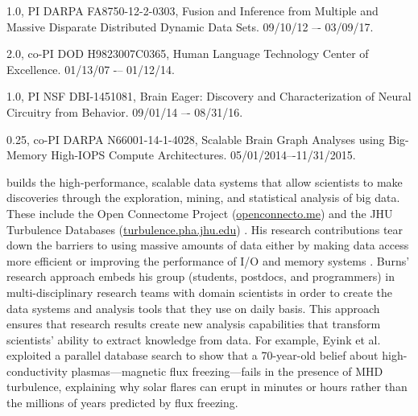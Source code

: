 \begin{list}{[]}{\settowidth{\labelwidth}{0.72 mos., co-PI}\leftmargin{}\advance\leftmargin 0.2in \setlength{\labelsep}{0.2in}}
\addtolength{\itemsep}{-4pt}

\item[1.0, PI]  DARPA FA8750-12-2-0303, Fusion and Inference from Multiple and Massive Disparate Distributed Dynamic Data Sets.  09/10/12 –- 03/09/17.

\item[2.0, co-PI] DOD H9823007C0365, Human Language Technology Center of Excellence. 01/13/07 -– 01/12/14. 

\item[1.0, PI] NSF DBI-1451081, Brain Eager: Discovery and Characterization of Neural Circuitry from Behavior. 09/01/14 –- 08/31/16.

\item[0.25, co-PI] DARPA N66001-14-1-4028, Scalable Brain Graph Analyses using Big-Memory High-IOPS Compute Architectures. 05/01/2014–-11/31/2015.

\end{list}

 builds the high-performance, scalable data systems that allow scientists 
to make discoveries through the exploration, mining, and statistical analysis
of big data.  These include the Open Connectome Project (\url{openconnecto.me})  \cite{Burns13} and the
JHU Turbulence Databases (\url{turbulence.pha.jhu.edu}) \cite{Li08}.  His research contributions tear down the barriers
to using massive amounts of data either by making data access more efficient 
or improving the performance of I/O and memory systems \cite{Kanov11,Zheng13}.
% 
Burns' research approach embeds his group (students, postdocs, and programmers) in multi-disciplinary 
research teams with domain scientists 
in order to create the data systems and analysis tools that they use on 
daily basis.  This approach ensures that research results 
create new analysis capabilities that transform scientists' ability
to extract knowledge from data. 
For example, Eyink et al.~\cite{Eyink13} exploited a parallel database search to show that a 70-year-old belief about
high-conductivity plasmas---magnetic flux freezing---fails in the presence of MHD turbulence,
explaining why solar flares can erupt in minutes or hours rather than the millions of years predicted by flux freezing.

